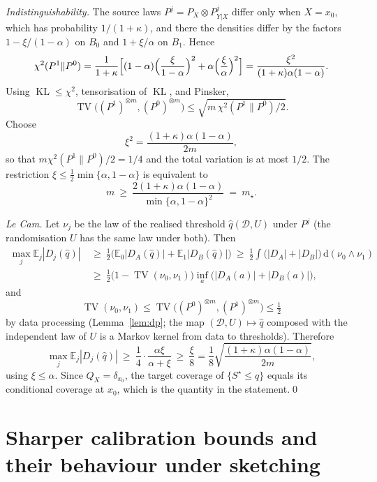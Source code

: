 \documentclass[11pt,a4paper]{article}
\newcommand{\PX}{P_X}
\newcommand{\QX}{Q_X}
\newcommand{\E}{\mathbb{E}}
\newcommand{\TV}{\operatorname{TV}}
\newcommand{\KL}{\operatorname{KL}}
\theoremstyle{plain}
\theoremstyle{definition}
\theoremstyle{remark}
\begin{document}
\emph{Indistinguishability.} The source laws $P^j=\PX\otimes P^j_{Y|X}$ differ only when $X=x_0$, which has probability $1/(1+\kappa)$, and there the densities differ by the factors $1-\xi/(1-\alpha)$ on $B_0$ and $1+\xi/\alpha$ on $B_1$. Hence
\[
\chi^2(P^1\|P^0)=\frac{1}{1+\kappa}\Bigl[(1-\alpha)\Bigl(\frac{\xi}{1-\alpha}\Bigr)^2+\alpha\Bigl(\frac\xi\alpha\Bigr)^2\Bigr]=\frac{\xi^2}{(1+\kappa)\alpha(1-\alpha)} .
\]
Using $\KL\le\chi^2$, tensorisation of $\KL$, and Pinsker,
\[
\TV\bigl((P^1)^{\otimes m},(P^0)^{\otimes m}\bigr)\le\sqrt{m\,\chi^2(P^1\|P^0)/2}.
\]
Choose
\[
\xi^2=\frac{(1+\kappa)\alpha(1-\alpha)}{2m},
\]
so that $m\chi^2(P^1\|P^0)/2=1/4$ and the total variation is at most $1/2$. The restriction $\xi\le\tfrac12\min\{\alpha,1-\alpha\}$ is equivalent to
\[
m\ \ge\ \frac{2(1+\kappa)\alpha(1-\alpha)}{\min\{\alpha,1-\alpha\}^2}\ =\ m_\star .
\]

\emph{Le Cam.} Let $\nu_j$ be the law of the realised threshold $\widehat q(\mathcal D,U)$ under $P^j$ (the randomisation $U$ has the same law under both). Then
\begin{align*}
\max_j\E_j|D_j(\widehat q)|&\ \ge\ \tfrac12\bigl(\E_0|D_A(\widehat q)|+\E_1|D_B(\widehat q)|\bigr)\ \ge\ \tfrac12\int\bigl(|D_A|+|D_B|\bigr)\,\mathrm d(\nu_0\wedge\nu_1)\\
&\ \ge\ \tfrac12\bigl(1-\TV(\nu_0,\nu_1)\bigr)\inf_a\bigl(|D_A(a)|+|D_B(a)|\bigr),
\end{align*}
and
\[
\TV(\nu_0,\nu_1)\le\TV\bigl((P^0)^{\otimes m},(P^1)^{\otimes m}\bigr)\le\tfrac12
\]
by data processing (Lemma~\ref{lem:dp}; the map $(\mathcal D,U)\mapsto\widehat q$ composed with the independent law of $U$ is a Markov kernel from data to thresholds). Therefore
\[
\max_j\E_j|D_j(\widehat q)|\ \ge\ \frac14\cdot\frac{\alpha\xi}{\alpha+\xi}\ \ge\ \frac\xi8=\frac18\sqrt{\frac{(1+\kappa)\alpha(1-\alpha)}{2m}},
\]
using $\xi\le\alpha$. Since $\QX=\delta_{x_0}$, the target coverage of $\{S^\star\le q\}$ equals its conditional coverage at $x_0$, which is the quantity in the statement.\qed

\section{Sharper calibration bounds and their behaviour under sketching}\label{app:sharper}
\end{document}

